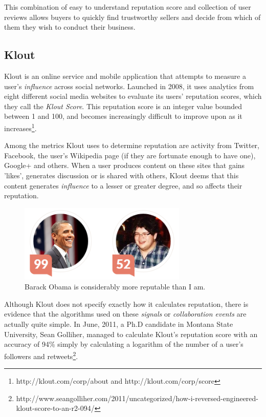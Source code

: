 \documentclass[]{final_report}
\begin{document}
This combination of easy to understand reputation score and collection of user reviews allows buyers to quickly find trustworthy sellers and decide from which of them they wish to conduct their business.

\subsection{Klout}

Klout is an online service and mobile application that attempts to measure a user's \textsl{influence} across social networks. Launched in 2008, it uses analytics from eight different social media websites to evaluate its users' reputation scores, which they call the \textsl{Klout Score}. This reputation score is an integer value bounded between 1 and 100, and becomes increasingly difficult to improve upon as it increases\footnote{http://klout.com/corp/about and http://klout.com/corp/score}.

Among the metrics Klout uses to determine reputation are activity from Twitter, Facebook, the user's Wikipedia page (if they are fortunate enough to have one), Google+ and others. When a user produces content on these sites that gains 'likes', generates discussion or is shared with others, Klout deems that this content generates \textsl{influence} to a lesser or greater degree, and so affects their reputation.

\begin{figure}[ht!]
\centering
\includegraphics[width=80mm]{klout.png}
\caption{Barack Obama is considerably more reputable than I am.}
\end{figure}

Although Klout does not specify exactly how it calculates reputation, there is evidence that the algorithms used on these \textsl{signals} or \textsl{collaboration events} are actually quite simple. In June, 2011, a Ph.D candidate in Montana State University, Sean Golliher, managed to calculate Klout's reputation score with an accuracy of 94\% simply by calculating a logarithm of the number of a user's followers and retweets\footnote{http://www.seangolliher.com/2011/uncategorized/how-i-reversed-engineered-klout-score-to-an-r2-094/}.
\end{document}

